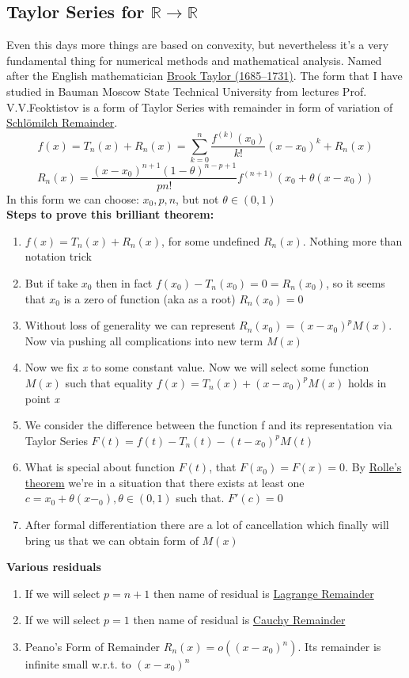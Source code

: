 \documentclass[12pt,a4paper]{article}
\theoremstyle{plain}
\begin{document}
\subsection{Taylor Series for $\mathbb{R} \to \mathbb{R}$}
Even this days more things are based on convexity, but nevertheless it’s a very fundamental thing for numerical methods and mathematical analysis. 
Named after the English mathematician \href{https://en.wikipedia.org/wiki/Brook_Taylor}{Brook Taylor (1685–1731)}.
The form that I have studied in Bauman Moscow State Technical University from lectures Prof. V.V.Feoktistov is a form of Taylor Series with remainder in form of variation of \href{https://mathworld.wolfram.com/SchloemilchRemainder.html}{Schlömilch Remainder}.
\begin{equation}
 f(x)=T_n(x)+R_n(x)=\sum_{k=0}^{n} \dfrac{f^{(k)}(x_0)}{k!}(x-x_0)^k+R_n(x)
\end{equation}
\begin{equation}
 R_n(x)=\dfrac{(x-x_0)^{n+1}(1-\theta)^{n-p+1}}{pn!}f^{(n+1)}(x_0+\theta(x-x_0)) 
\end{equation}
In this form we can choose: \textbf{$x_0,p,n$}, but not $\theta \in (0,1)$\\
\textbf{Steps to prove this brilliant theorem:}
\begin{enumerate}
 \item $f(x)=T_n(x)+R_n(x)$, for some undefined $R_n(x)$. Nothing more than notation trick
 \item But if take $x_0$ then in fact $f(x_0)-T_n(x_0)=0=R_n(x_0)$, so it seems that $x_0$ is a zero of function (aka as a root) $R_n(x_0)=0$
 \item Without loss of generality we can represent $R_n(x_0)=(x-x_0)^pM(x)$. Now via pushing all complications into new term $M(x)$
 \item Now we fix \textit{x} to some constant value. Now we will select some function $M(x)$ such that equality 
 $f(x)=T_n(x)+(x-x_0)^pM(x)$ holds in point \textit{x}
 \item We consider the difference between the function f and its representation via Taylor Series $F(t)=f(t)-T_n(t)-(t-x_0)^pM(t)$ 
 \item What is special about function $F(t)$, that $F(x_0)=F(x)=0$. By \href{https://en.wikipedia.org/wiki/Rolle\%27s_theorem}{Rolle’s theorem} we’re in a situation that there exists at least one $c=x_0+\theta(x-_0), \theta \in (0,1)$ such that. $F'(c)=0$
 \item After formal differentiation there are a lot of cancellation which finally will bring us that we can obtain form of $M(x)$ 
\end{enumerate}
\textbf{Various residuals}
\begin{enumerate}
 \item If we will select $p=n+1$ then name of residual is \href{https://mathworld.wolfram.com/LagrangeRemainder.html}{Lagrange Remainder}
 \item If we will select $p=1$ then name of residual is \href{https://mathworld.wolfram.com/CauchyRemainder.html}{Cauchy Remainder} 
 \item Peano’s Form of Remainder $R_n(x)=o((x-x_0)^n)$. Its remainder is infinite small w.r.t. to $(x-x_0)^n$
\end{enumerate}
\end{document}
